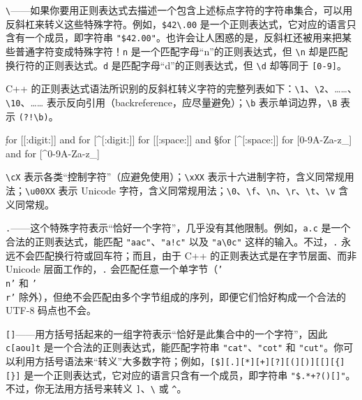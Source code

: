 \texttt{\textbackslash{}}——如果你要用正则表达式去描述一个包含上述标点字符的字符串集合，可以用反斜杠来转义这些特殊字符。例如，\texttt{\$42\textbackslash{}.00} 是一个正则表达式，它对应的语言只含有一个成员，即字符串 \texttt{"\$42.00"}。也许会让人困惑的是，反斜杠还被用来把某些普通字符变成特殊字符！\texttt{n} 是一个匹配字母“n”的正则表达式，但 \texttt{\textbackslash{}n} 却是匹配换行符的正则表达式。\texttt{d} 是匹配字母“d”的正则表达式，但 \texttt{\textbackslash{}d} 却等同于 \texttt{[0-9]}。

C++ 的正则表达式语法所识别的反斜杠转义字符的完整列表如下：\texttt{\textbackslash{}1}、\texttt{\textbackslash{}2}、……、\texttt{\textbackslash{}10}、…… 表示反向引用（backreference，应尽量避免）；\texttt{\textbackslash{}b} 表示单词边界，\texttt{\textbackslash{}B} 表示 \texttt{(?!\textbackslash{}b)}。

\begin{codebox}[cpp]
\d for [[:digit:]] and \D for [^[:digit:]]
\s for [[:space:]] and \S for [^[:space:]]
\w for [0-9A-Za-z_] and \W for [^0-9A-Za-z_]
\end{codebox}

\texttt{\textbackslash{}cX} 表示各类“控制字符”（应避免使用）；\texttt{\textbackslash{}xXX} 表示十六进制字符，含义同常规用法；\texttt{\textbackslash{}u00XX} 表示 Unicode 字符，含义同常规用法；\texttt{\textbackslash{}0}、\texttt{\textbackslash{}f}、\texttt{\textbackslash{}n}、\texttt{\textbackslash{}r}、\texttt{\textbackslash{}t}、\texttt{\textbackslash{}v} 含义同常规。

\texttt{.}——这个特殊字符表示“恰好一个字符”，几乎没有其他限制。例如，\texttt{a.\allowbreak{}c} 是一个合法的正则表达式，能匹配 \texttt{"aac"}、\texttt{"a!c"} 以及 \texttt{"a\textbackslash{}0c"} 这样的输入。不过，\texttt{.} 永远不会匹配换行符或回车符；而且，由于 C++ 的正则表达式是在字节层面、而非 Unicode 层面工作的，\texttt{.} 会匹配任意一个单字节（\texttt{'\\n'} 和 \texttt{'\\r'} 除外），但绝不会匹配由多个字节组成的序列，即便它们恰好构成一个合法的 UTF-8 码点也不会。

\texttt{[]}——用方括号括起来的一组字符表示“恰好是此集合中的一个字符”，因此 \texttt{c[aou]t} 是一个合法的正则表达式，能匹配字符串 \texttt{"cat"}、\texttt{"cot"} 和 \texttt{"cut"}。你可以利用方括号语法来“转义”大多数字符；例如，\texttt{[\$][.][*][+][?][(\allowbreak{}][)\allowbreak{}][[][\{][\}]\textbar} 是一个正则表达式，它对应的语言只含有一个成员，即字符串 \texttt{"\$.*+?()[{}]\textbar"}。不过，你无法用方括号来转义 \texttt{]}、\texttt{\textbackslash{}} 或 \texttt{\textasciicircum{}}。

